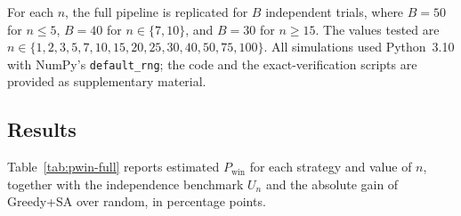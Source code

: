 For each $n$, the full pipeline is replicated for $B$ independent trials,
where $B = 50$ for $n \le 5$, $B = 40$ for $n \in \{7,10\}$, and $B = 30$
for $n \ge 15$.  The values tested are
$n \in \{1, 2, 3, 5, 7, 10, 15, 20, 25, 30, 40, 50, 75, 100\}$.
All simulations used Python~3.10 with NumPy's \texttt{default\_rng};
the code and the exact-verification scripts are provided as supplementary
material.

\subsection{Results}
\label{sec:results-main}

Table~\ref{tab:pwin-full} reports estimated $P_{\mathrm{win}}$ for each
strategy and value of $n$, together with the independence benchmark $U_n$
and the absolute gain of Greedy+SA over random, in percentage points.


